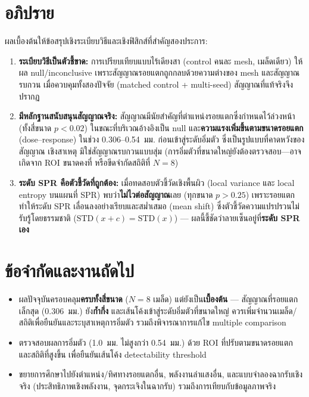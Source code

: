 \documentclass[14pt]{extarticle}
\begin{document}
\section{อภิปราย}
ผลเบื้องต้นให้ข้อสรุปเชิงระเบียบวิธีและเชิงฟิสิกส์ที่สำคัญสองประการ:
\begin{enumerate}
  \item \textbf{ระเบียบวิธีเป็นตัวชี้ขาด:} การเปรียบเทียบแบบไร้เดียงสา (control คนละ mesh, เมล็ดเดียว)
        ให้ผล null/inconclusive เพราะสัญญาณรอยแตกถูกกลบด้วยความต่างของ mesh และสัญญาณรบกวน
        เมื่อควบคุมทั้งสองปัจจัย (matched control + multi-seed) สัญญาณที่แท้จริงจึงปรากฏ
  \item \textbf{มีหลักฐานสนับสนุนสัญญาณจริง:} สัญญาณมีนัยสำคัญที่ตำแหน่งรอยแตกซึ่งกำหนดไว้ล่วงหน้า
        (ทั้งสี่ขนาด $p<0.02$) ในขณะที่บริเวณอ้างอิงเป็น null และ\textbf{ความแรงเพิ่มขึ้นตามขนาดรอยแตก}
        (dose--response) ในช่วง 0.306--0.54~มม. ก่อนเข้าสู่ระดับอิ่มตัว ซึ่งเป็นรูปแบบที่คาดหวังของสัญญาณ
        เชิงสาเหตุ มิใช่สัญญาณรบกวนแบบสุ่ม (การอิ่มตัวที่ขนาดใหญ่ยังต้องตรวจสอบ---อาจเกิดจาก ROI ขนาดคงที่
        หรือขีดจำกัดสถิติที่ $N=8$)
  \item \textbf{ระดับ SPR คือตัวชี้วัดที่ถูกต้อง:} เมื่อทดสอบตัวชี้วัดเชิงพื้นผิว (local variance และ local
        entropy บนแผนที่ SPR) พบว่า\textbf{ไม่ไวต่อสัญญาณ}เลย (ทุกขนาด $p>0.25$) เพราะรอยแตกทำให้ระดับ SPR
        เลื่อนลงอย่างเรียบและสม่ำเสมอ (mean shift) ซึ่งตัวชี้วัดความแปรปรวนไม่รับรู้โดยธรรมชาติ
        ($\mathrm{STD}(x+c)=\mathrm{STD}(x)$) --- ผลนี้ชี้ชัดว่าลายเซ็นอยู่ที่\textbf{ระดับ SPR เอง}
\end{enumerate}

\section{ข้อจำกัดและงานถัดไป}
\begin{itemize}
  \item ผลปัจจุบันครอบคลุม\textbf{ครบทั้งสี่ขนาด} ($N=8$ เมล็ด) แต่ยังเป็น\textbf{เบื้องต้น} ---
        สัญญาณที่รอยแตกเล็กสุด (0.306~มม.) ยัง\textbf{ก้ำกึ่ง} และเส้นโค้งเข้าสู่ระดับอิ่มตัวที่ขนาดใหญ่
        ควรเพิ่มจำนวนเมล็ด/สถิติเพื่อยืนยันและระบุสาเหตุการอิ่มตัว รวมถึงพิจารณาการแก้ไข multiple comparison
  \item ตรวจสอบผลการอิ่มตัว (1.0~มม. ไม่สูงกว่า 0.54~มม.) ด้วย ROI ที่ปรับตามขนาดรอยแตก
        และสถิติที่สูงขึ้น เพื่อยืนยันเส้นโค้ง detectability threshold
  \item ขยายการศึกษาไปยังตำแหน่ง/ทิศทางรอยแตกอื่น, พลังงานลำแสงอื่น, และแบบจำลองฉากรับเชิงจริง
        (ประสิทธิภาพเชิงพลังงาน, จุดกระเจิงในฉากรับ) รวมถึงการเทียบกับข้อมูลภาพจริง
\end{itemize}
\end{document}
